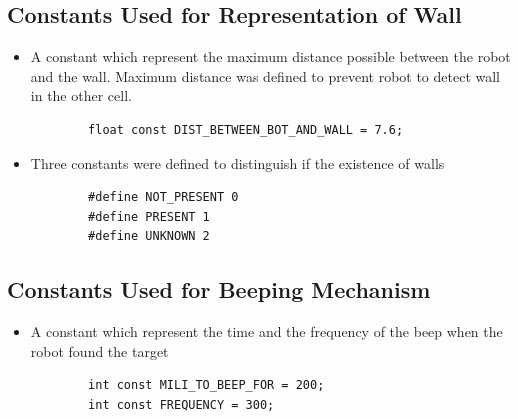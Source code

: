 \documentclass[11pt]{article}
\begin{document}

\subsection{Constants Used for Representation of Wall}
\begin{itemize}
\item A constant which represent the maximum distance possible between the robot and the wall. Maximum distance was defined to prevent robot to detect wall in the other cell.
	\begin{verbatim}
		float const DIST_BETWEEN_BOT_AND_WALL = 7.6;
	\end{verbatim}
\item Three constants were defined to distinguish if the existence of walls
	\begin{verbatim}
		#define NOT_PRESENT 0 
		#define PRESENT 1
		#define UNKNOWN 2
	\end{verbatim}
\end{itemize}


\subsection{Constants Used for Beeping Mechanism}
\begin{itemize}
\item A constant which represent the time and the frequency of the beep when the robot found the target
	\begin{verbatim}
		int const MILI_TO_BEEP_FOR = 200;
		int const FREQUENCY = 300;
	\end{verbatim}
\end{itemize}

\newpage

\end{document}
